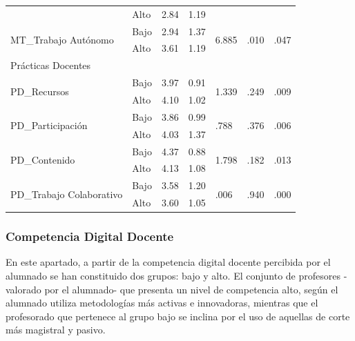 \documentclass[spanish]{textolivre}
\begin{document}
\begin{table}[h]
\begin{threeparttable}
\begin{tabular}{*{7}{l}}
    & Alto & 2.84 & 1.19 & & & \\
    \multirow{2}{*}{MT\_Trabajo Autónomo} & Bajo & 2.94 & 1.37 & \multirow{2}{*}{6.885} & \multirow{2}{*}{.010} & \multirow{2}{*}{.047} \\
    & Alto & 3.61 & 1.19 & & & \\
    \midrule
    Prácticas Docentes & & & & & & \\
    \midrule
    \multirow{2}{*}{PD\_Recursos} & Bajo & 3.97 & 0.91 & \multirow{2}{*}{1.339} & \multirow{2}{*}{.249} & \multirow{2}{*}{.009} \\
    & Alto & 4.10 & 1.02 & & & \\
    \multirow{2}{*}{PD\_Participación} & Bajo & 3.86 & 0.99 & \multirow{2}{*}{.788} & \multirow{2}{*}{.376} & \multirow{2}{*}{.006} \\
    & Alto & 4.03 & 1.37 & & & \\
    \multirow{2}{*}{PD\_Contenido} & Bajo & 4.37 & 0.88 & \multirow{2}{*}{1.798} & \multirow{2}{*}{.182} & \multirow{2}{*}{.013} \\
    & Alto & 4.13 & 1.08 & & & \\
    \multirow{2}{*}{PD\_Trabajo Colaborativo} & Bajo & 3.58 & 1.20 & \multirow{2}{*}{.006} & \multirow{2}{*}{.940} & \multirow{2}{*}{.000} \\
    & Alto & 3.60 & 1.05 & & & \\
    \bottomrule
    \end{tabular}
    \end{threeparttable}
\end{table}



\subsubsection{Competencia Digital Docente}
En este apartado, a partir de la competencia digital docente percibida por el alumnado se han constituido dos grupos: bajo y alto. El conjunto de profesores -valorado por el alumnado- que presenta un nivel de competencia alto, según el alumnado utiliza metodologías más activas e innovadoras, mientras que el profesorado que pertenece al grupo bajo se inclina por el uso de aquellas de corte más magistral y pasivo.  
\end{document}
